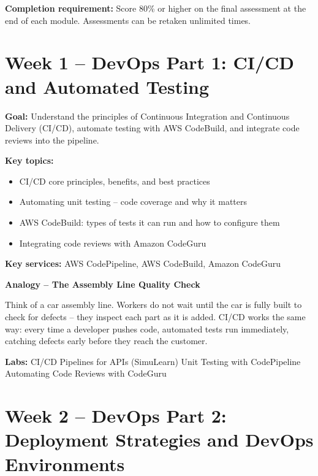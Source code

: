 \documentclass[12pt,a4paper]{article}
\begin{document}
\textbf{Completion requirement:} Score 80\% or higher on the final assessment at the
end of each module. Assessments can be retaken unlimited times.

\newpage

\section{Week 1 -- DevOps Part 1: CI/CD and Automated Testing}

\textbf{Goal:} Understand the principles of Continuous Integration and Continuous
Delivery (CI/CD), automate testing with AWS CodeBuild, and integrate code reviews
into the pipeline.

\textbf{Key topics:}
\begin{itemize}[leftmargin=1.5em]
  \item CI/CD core principles, benefits, and best practices
  \item Automating unit testing -- code coverage and why it matters
  \item AWS CodeBuild: types of tests it can run and how to configure them
  \item Integrating code reviews with Amazon CodeGuru
\end{itemize}

\textbf{Key services:} AWS CodePipeline, AWS CodeBuild, Amazon CodeGuru

\begin{analogybox}
\textbf{Analogy -- The Assembly Line Quality Check}

Think of a car assembly line. Workers do not wait until the car is fully built to
check for defects -- they inspect each part as it is added. CI/CD works the same
way: every time a developer pushes code, automated tests run immediately, catching
defects early before they reach the customer.
\end{analogybox}

\textbf{Labs:} CI/CD Pipelines for APIs (SimuLearn) \textbullet{}
Unit Testing with CodePipeline \textbullet{}
Automating Code Reviews with CodeGuru

\newpage

\section{Week 2 -- DevOps Part 2: Deployment Strategies and DevOps Environments}
\end{document}
